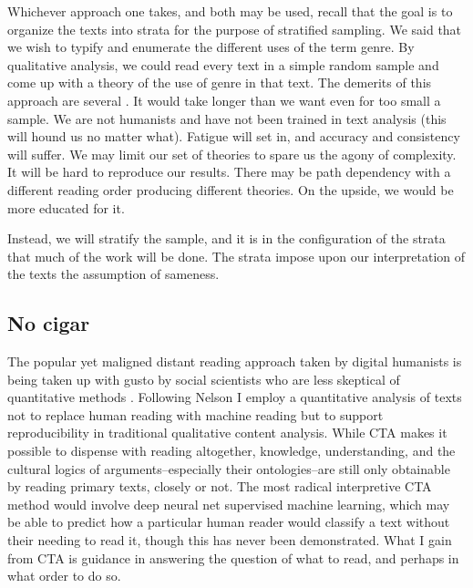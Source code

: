 \documentclass[]{book}
\theoremstyle{definition}
\theoremstyle{definition}
\theoremstyle{definition}
\theoremstyle{remark}
\begin{document}
Whichever approach one takes, and both may be used, recall that the goal
is to organize the texts into strata for the purpose of stratified
sampling. We said that we wish to typify and enumerate the different
uses of the term genre. By qualitative analysis, we could read every
text in a simple random sample and come up with a theory of the use of
genre in that text. The demerits of this approach are several
\citep[c.f.][5]{Nelson2017Computational}. It would take longer than we
want even for too small a sample. We are not humanists and have not been
trained in text analysis (this will hound us no matter what). Fatigue
will set in, and accuracy and consistency will suffer. We may limit our
set of theories to spare us the agony of complexity. It will be hard to
reproduce our results. There may be path dependency with a different
reading order producing different theories. On the upside, we would be
more educated for it.

Instead, we will stratify the sample, and it is in the configuration of
the strata that much of the work will be done. The strata impose upon
our interpretation of the texts the assumption of sameness.

\hypertarget{no-cigar}{%
\subsection{No cigar}\label{no-cigar}}

The popular yet maligned distant reading approach taken by digital
humanists \citep[e.g.~][]{Moretti2005Graphs} is being taken up with
gusto by social scientists who are less skeptical of quantitative
methods \citep[e.g.~][]{DiMaggio2013Exploiting}. Following Nelson
\citeyearpar{Nelson2017Computational} I employ a quantitative analysis
of texts not to replace human reading with machine reading but to
support reproducibility in traditional qualitative content analysis.
While CTA makes it possible to dispense with reading altogether,
knowledge, understanding, and the cultural logics of
arguments--especially their ontologies--are still only obtainable by
reading primary texts, closely or not. The most radical interpretive CTA
method would involve deep neural net supervised machine learning, which
may be able to predict how a particular human reader would classify a
text without their needing to read it, though this has never been
demonstrated. What I gain from CTA is guidance in answering the question
of what to read, and perhaps in what order to do so.
\end{document}
